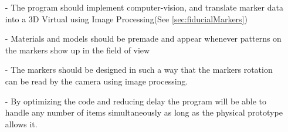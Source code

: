 \begin{itemize}
						\item[-] The program should implement computer-vision, and translate marker data into a 3D Virtual using Image Processing(See \autoref{sec:fiducialMarkers})
						\item[-] Materials and models should be premade and appear whenever patterns on the markers show up in the field of view
						\item[-] The markers should be designed in such a way that the markers rotation can be read by the camera using image processing.
						\item[-] By optimizing the code and reducing delay the program will be able to handle any number of items simultaneously as long as the physical prototype allows it.
					\end{itemize}
			